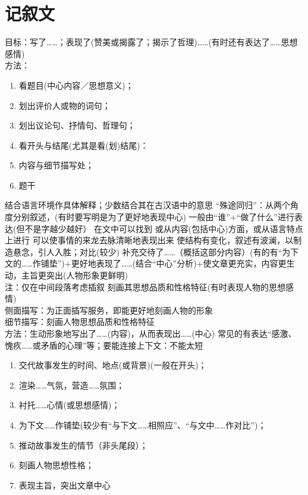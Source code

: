 \section{记叙文}
  目标：写了\ldots{}\ldots{}；表现了(赞美或揭露了；揭示了哲理)\ldots{}\ldots{}(有时还有表达了\ldots{}\ldots{}思想感情)\\
  方法：\begin{enumerate}\item 看题目(中心内容／思想意义)；
        \item 划出评价人或物的词句；
        \item 划出议论句、抒情句、哲理句；
        \item 看开头与结尾(尤其是看(划)结尾)：
        \item 内容与细节描写处；
        \item 题干
\end{enumerate}
结合语言环境作具体解释；少数结合其在古汉语中的意思
``殊途同归''：从两个角度分别叙述，(有时要写明是为了更好地表现中心)
一般由``谁''+``做了什么''进行表达(但不是字越少越好）
  在文中可以找到
  或从内容(包括中心)方面，或从语言特点上进行
  可以使事情的来龙去脉清晰地表现出来
  使结构有变化，叙述有波澜，以制造悬念，引人入胜；对比(较少)
  补充交待了\ldots{}\ldots{}（概括这部分内容）(有的有``为下文的\ldots{}\ldots{}作铺垫'')+更好地表现了\ldots{}\ldots{}(结合``中心''分析)+使文章更充实，内容更生动，主旨更突出(人物形象更鲜明)
\\注：仅在中间段落考虑插叙
  刻画其思想品质和性格特征(有时表现人物的思想感情)
  \\侧面描写：为正面插写服务，即能更好地刻画人物的形象
  \\细节描写：刻画人物思想品质和性格特征
  \\方法：生动形象地写出了\ldots{}\ldots{}(内容)，从而表现出\ldots{}\ldots{}(中心)
  常见的有表达``感激、愧疚\ldots{}\ldots{}或矛盾的心理''等；要能连接上下文：不能太短
\begin{enumerate}
\item 交代故事发生的时间、地点(或背景)(一般在开头)；
\item 渲染\ldots{}\ldots{}气氛，营造\ldots{}\ldots{}氛围；
\item 衬托\ldots{}\ldots{}心情(或思想感情)；
\item 为下文\ldots{}\ldots{}作铺垫(较少有``与下文\ldots{}\ldots{}相照应''、``与文中\ldots{}\ldots{}作对比'')；
\item 推动故事发生的情节（非头尾段）；
\item 刻画人物思想性格；
\item 表现主旨，突出文章中心
\end{enumerate}
